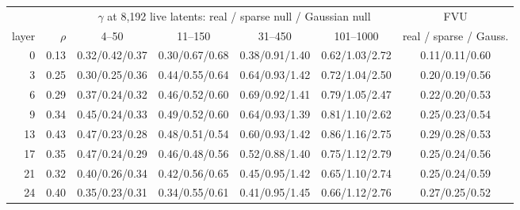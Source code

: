 \begin{tabular}{r r cccc c}
\toprule
 & & \multicolumn{4}{c}{$\gamma$ at 8,192 live latents: real / sparse null / Gaussian null} & FVU \\
\cmidrule(lr){3-6}
layer & $\rho$ & 4--50 & 11--150 & 31--450 & 101--1000 & real / sparse / Gauss. \\
\midrule
0 & 0.13 & 0.32/0.42/0.37 & 0.30/0.67/0.68 & 0.38/0.91/1.40 & 0.62/1.03/2.72 & 0.11/0.11/0.60 \\
3 & 0.25 & 0.30/0.25/0.36 & 0.44/0.55/0.64 & 0.64/0.93/1.42 & 0.72/1.04/2.50 & 0.20/0.19/0.56 \\
6 & 0.29 & 0.37/0.24/0.32 & 0.46/0.52/0.60 & 0.69/0.92/1.41 & 0.79/1.05/2.47 & 0.22/0.20/0.53 \\
9 & 0.34 & 0.45/0.24/0.33 & 0.49/0.52/0.60 & 0.64/0.93/1.39 & 0.81/1.10/2.62 & 0.25/0.23/0.54 \\
13 & 0.43 & 0.47/0.23/0.28 & 0.48/0.51/0.54 & 0.60/0.93/1.42 & 0.86/1.16/2.75 & 0.29/0.28/0.53 \\
17 & 0.35 & 0.47/0.24/0.29 & 0.46/0.48/0.56 & 0.52/0.88/1.40 & 0.75/1.12/2.79 & 0.25/0.24/0.56 \\
21 & 0.32 & 0.40/0.26/0.34 & 0.42/0.56/0.65 & 0.45/0.95/1.42 & 0.65/1.10/2.74 & 0.25/0.24/0.59 \\
24 & 0.40 & 0.35/0.23/0.31 & 0.34/0.55/0.61 & 0.41/0.95/1.45 & 0.66/1.12/2.76 & 0.27/0.25/0.52 \\
\bottomrule
\end{tabular}
